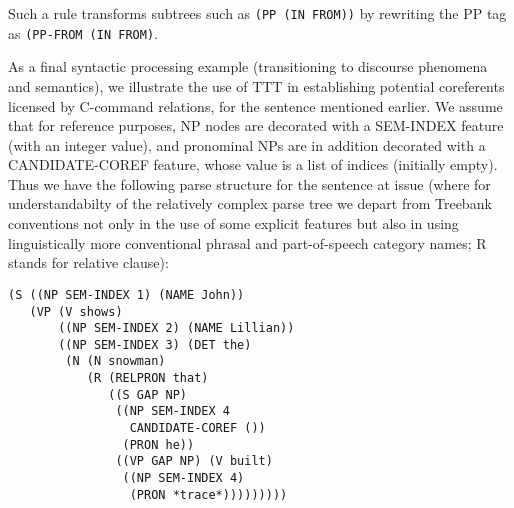 \documentclass[a4,11pt]{article}
\begin{document}
\normalsize
\noindent Such a rule transforms subtrees such as {\small\tt (PP (IN FROM))} by rewriting the PP tag as {\small\tt(PP-FROM (IN FROM)}.



As a final syntactic processing example (transitioning to discourse phenomena and semantics), we illustrate the use of TTT in establishing potential coreferents licensed by C-command relations, for the sentence mentioned earlier. We assume that for reference purposes, NP nodes are decorated with a SEM-INDEX feature (with an integer value), and pronominal NPs are in addition decorated with a CANDIDATE-COREF feature, whose value is a list of indices (initially empty). Thus we have the following parse structure for the sentence at issue (where for understandabilty of the relatively complex parse tree we depart from Treebank conventions not only in the use of some explicit features but also in using linguistically more conventional phrasal and part-of-speech category names; R stands for relative clause):


\scriptsize
\begin{verbatim}
(S ((NP SEM-INDEX 1) (NAME John))
   (VP (V shows) 
       ((NP SEM-INDEX 2) (NAME Lillian))
       ((NP SEM-INDEX 3) (DET the)
        (N (N snowman)
           (R (RELPRON that)
              ((S GAP NP)
               ((NP SEM-INDEX 4 
                 CANDIDATE-COREF ())
                (PRON he))
               ((VP GAP NP) (V built)
                ((NP SEM-INDEX 4) 
                 (PRON *trace*)))))))))
\end{verbatim}
\end{document}
